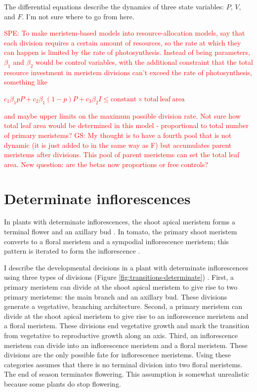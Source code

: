 \documentclass[12pt, oneside]{article}   	%
\begin{document}
The differential equations describe the dynamics of three state variables: $P$, $V$, and $F$. I'm not sure where to go from here.

\textcolor{red}{SPE: To make meristem-based models into resource-allocation models, say that each division requires a certain amount of resources, so the rate at which they can happen is limited by the rate of photosynthesis. Instead of being parameters, $\beta_1$ and $\beta_2$ would be control variables, with the additional constraint that the total resource investment in meristem divisions can't exceed the rate of photosynthesis, something like}

\textcolor{red}{$c_1 \beta_1 p P + c_2 \beta_1 (1-p) P + c_3 \beta_2 I  \le \mathrm{constant}\times \mathrm{total\ leaf\ area} $}

\textcolor{red}{and maybe upper limits on the maximum possible division rate. Not sure how total leaf area would be determined in this model - proportional to total number of primary meristems? GS: My thought is to have a fourth pool that is not dynamic (it is just added to in the same way as F) but accumulates parent meristems after divisions. This pool of parent meristems can set the total leaf area. New question: are the betas now proportions or free controls?}
\fi

\section{Determinate inflorescences}

In plants with determinate inflorescences, the shoot apical meristem forms a terminal flower and an axillary bud \cite{bartlett2014}. In tomato, the primary shoot meristem converts to a floral meristem and a sympodial inflorescence meristem; this pattern is iterated to form the inflorescence \cite{Park2012}. 

I describe the developmental decisions in a plant with determinate inflorescences using three types of divisions (Figure \ref{fig:transitions-determinate}) \cite{itzkovitz2012}. First, a primary meristem can divide at the shoot apical meristem to give rise to two primary meristems: the main branch and an axillary bud. These divisions generate a vegetative, branching architecture. Second, a primary meristem can divide at the shoot apical meristem to give rise to an inflorescence meristem and a floral meristem. These divisions end vegetative growth and mark the transition from vegetative to reproductive growth along an axis. Third, an inflorescence meristem can divide into an inflorescence meristem and a floral meristem. These divisions are the only possible fate for inflorescence meristems. Using these categories assumes that there is no terminal division into two floral meristems. The end of season terminates flowering. This assumption is somewhat unrealistic because some plants do stop flowering. 
\end{document}
